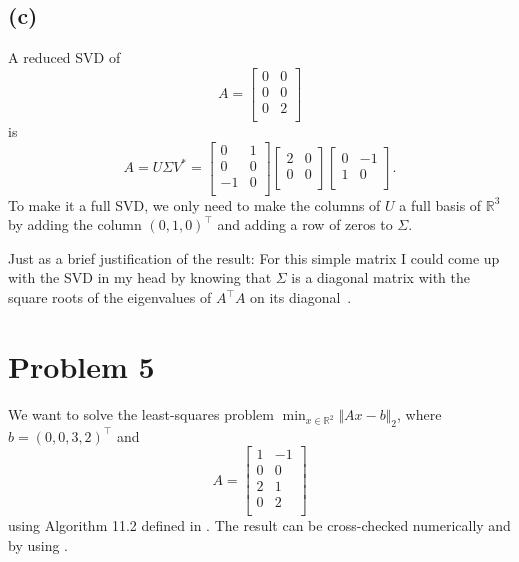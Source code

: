 \documentclass[a4paper, 11pt]{article}
\begin{document}
\subsection*{(c)}
A reduced SVD of
\begin{equation*}
 A =
  \begin{bmatrix}
  0 & 0 \\
  0 & 0 \\
  0 & 2 \\
  \end{bmatrix}
\end{equation*}
is
\begin{equation*}
 A = U\Sigma V^* =
  \begin{bmatrix}
  0 & 1 \\
  0 & 0 \\
  -1 & 0 \\
  \end{bmatrix}
  \begin{bmatrix}
  2 & 0 \\
  0 & 0 \\
  \end{bmatrix}
  \begin{bmatrix}
  0 & -1 \\
  1 & 0 \\
  \end{bmatrix}.
\end{equation*}
To make it a full SVD, we only need to make the columns of $U$ a full basis of
$\mathbb{R}^{3}$ by adding the column $(0, 1, 0)^{\top}$ and adding a row of zeros
to $\Sigma$.

Just as a brief justification of the result: For this simple
matrix I could come up with the SVD in my head by knowing that $\Sigma$ is a
diagonal matrix with the square roots of the eigenvalues of $A^\top A$
on its diagonal~\cite[Theorem 5.4]{tb}.

\section*{Problem 5}
We want to solve the least-squares problem $\min_{x \in \mathbb{R}^2} \Vert Ax
- b\Vert_2$, where $b
= (0, 0, 3, 2)^\top$ and
\begin{equation*}
  A =
  \begin{bmatrix}
  1 & -1 \\
  0 & 0 \\
  2 & 1 \\
  0 & 2 \\
  \end{bmatrix}
\end{equation*}
using Algorithm 11.2 defined in \cite{tb}. The result can be cross-checked
numerically and by using \cite[(11.12)]{tb}.
\end{document}

